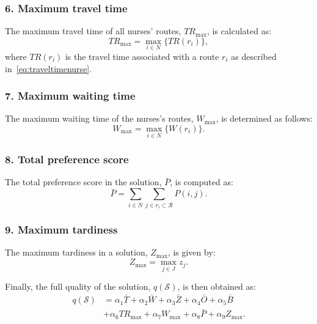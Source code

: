 \documentclass[a4paper,11pt,authoryear]{elsarticle}
\begin{document}
\subsubsection*{6. Maximum travel time}
\noindent The maximum travel time of all nurses' routes, $TR_{\text{max}}$, is calculated as:
\begin{equation}
	TR_{\text{max}} = \max_{i \in N} \{TR(r_i)\}, \label{eq:maxtraveltime}
\end{equation}
where $TR(r_i)$ is the travel time associated with a route $r_i$ as described in~\eqref{eq:traveltimenurse}.

\subsubsection*{7. Maximum waiting time}
\noindent The maximum waiting time of the nurses's routes, $W_{\text{max}}$, is determined as follows: 
\begin{equation}
	W_{\text{max}} = \max_{i \in N} \{W(r_i)\}. \label{eq:maxwaitingtime}
\end{equation}

\subsubsection*{8. Total preference score}
\noindent The total preference score in the solution, $\bar{P}$, is computed as:
\begin{equation}
    \bar{P} = \sum_{i \in N} \sum_{j \in r_i \subset \mathcal{R}} P(i,j). \label{eq:totalpreference}
\end{equation}

\subsubsection*{9. Maximum tardiness}
\noindent The maximum tardiness in a solution, $Z_{\text{max}}$, is given by:
\begin{equation}
	Z_{\text{max}} = \max_{j \in J} z_j. \label{eq:maxtardiness}
\end{equation}


Finally, the full quality of the solution, $q(\mathcal{S})$, is then obtained as:
\begin{align}
	q(\mathcal{S}) &= \alpha_1 \bar{T} %
	+ \alpha_2 \bar{W} %
	+ \alpha_3 \bar{Z} %
	+ \alpha_4 \bar{O} %
	+ \alpha_5 \bar{B} \nonumber \\%
	&+ \alpha_6 TR_{\text{max}} %
	+ \alpha_7 W_{\text{max}} %
	+ \alpha_8 \bar{P} %
	+ \alpha_9 Z_{\text{max}}. \label{eq:solutionquality}
\end{align}
\end{document}
